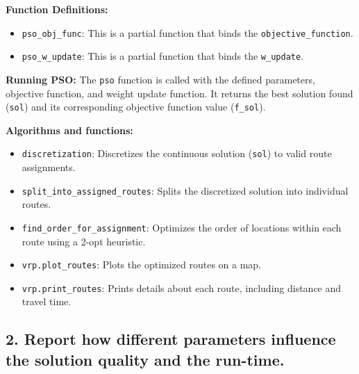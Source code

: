 \documentclass[letterpaper, 12pt]{article}
\begin{document}
\textbf{Function Definitions:}

\begin{itemize}
        \item \verb|pso_obj_func|: This is a partial function that binds the \verb|objective_function|.
        \item \verb|pso_w_update|: This is a partial function that binds the \verb|w_update|.
\end{itemize}

\textbf{Running PSO:} The \verb|pso| function is called with the defined parameters, objective function, and weight update function. It returns the best solution found (\verb|sol|) and its corresponding objective function value (\verb|f_sol|).

\textbf{Algorithms and functions:}
\begin{itemize}
        \item \verb|discretization|: Discretizes the continuous solution (\verb|sol|) to valid route assignments.
        \item \verb|split_into_assigned_routes|: Splits the discretized solution into individual routes.
        \item \verb|find_order_for_assignment|: Optimizes the order of locations within each route using a 2-opt heuristic.
        \item \verb|vrp.plot_routes|: Plots the optimized routes on a map.
        \item \verb|vrp.print_routes|: Prints details about each route, including distance and travel time.
\end{itemize}

\subsection*{2. Report how different parameters influence the solution quality and the run-time.}
\end{document}

